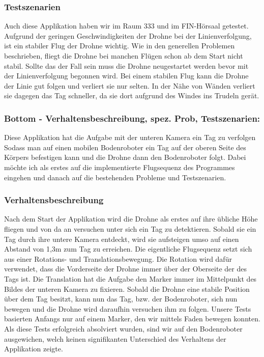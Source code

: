 \subsubsection*{Testszenarien }

Auch diese Applikation haben wir im Raum 333 und im FIN-\/Hörsaal getestet. Aufgrund der geringen Geschwindigkeiten der Drohne bei der Linienverfolgung, ist ein stabiler Flug der Drohne wichtig. Wie in den generellen Problemen beschrieben, fliegt die Drohne bei manchen Flügen schon ab dem Start nicht stabil. Sollte das der Fall sein muss die Drohne neugestartet werden bevor mit der Linienverfolgung begonnen wird. Bei einem stabilen Flug kann die Drohne der Linie gut folgen und verliert sie nur selten. In der Nähe von Wänden verliert sie dagegen das Tag schneller, da sie dort aufgrund des Windes ins Trudeln gerät.

\subsubsection*{Bottom -\/ Verhaltensbeschreibung, spez. Prob, Testszenarien: }

Diese Applikation hat die Aufgabe mit der unteren Kamera ein Tag zu verfolgen Sodass man auf einen mobilen Bodenroboter ein Tag auf der oberen Seite des Körpers befestigen kann und die Drohne dann den Bodenroboter folgt. Dabei möchte ich als erstes auf die implementierte Flugsequenz des Programmes eingehen und danach auf die bestehenden Probleme und Testszenarien.

\subsubsection*{Verhaltensbeschreibung }

Nach dem Start der Applikation wird die Drohne als erstes auf ihre übliche Höhe fliegen und von da an versuchen unter sich ein Tag zu detektieren. Sobald sie ein Tag durch ihre untere Kamera entdeckt, wird sie aufsteigen umso auf einen Abstand von 1,3m zum Tag zu erreichen. Die eigentliche Flugsequenz setzt sich aus einer Rotations-\/ und Translationsbewegung. Die Rotation wird dafür verwendet, dass die Vorderseite der Drohne immer über der Oberseite der des Tags ist. Die Translation hat die Aufgabe den Marker immer im Mittelpunkt des Bildes der unteren Kamera zu fixieren. Sobald die Drohne eine stabile Position über dem Tag besitzt, kann nun das Tag, bzw. der Bodenroboter, sich nun bewegen und die Drohne wird daraufhin versuchen ihm zu folgen. Unsere Tests basierten Anfangs nur auf einem Marker, den wir mittels Faden bewegen konnten. Als diese Tests erfolgreich absolviert wurden, sind wir auf den Bodenroboter ausgewichen, welch keinen signifikanten Unterschied des Verhaltens der Applikation zeigte.

